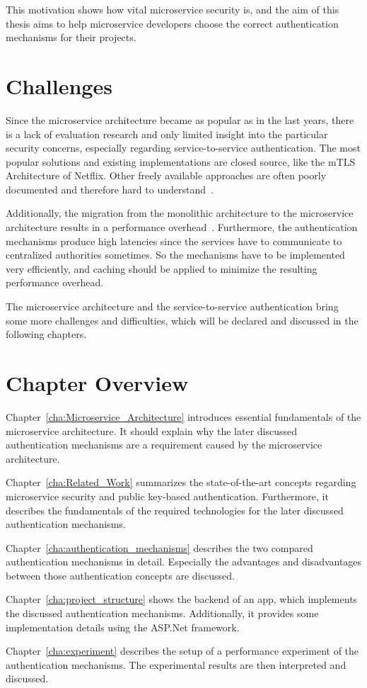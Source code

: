 This motivation shows how vital microservice security is, and the aim of this thesis aims to help microservice developers choose the correct authentication mechanisms for their projects.

\section{Challenges}
Since the microservice architecture became as popular as in the last years, there is a lack of evaluation research and only limited insight into the particular security concerns, especially regarding service-to-service authentication. 
The most popular solutions and existing implementations are closed source, like the mTLS Architecture of Netflix.
Other freely available approaches are often poorly documented and therefore hard to understand~\cite{yarygina2018overcoming}.

Additionally, the migration from the monolithic architecture to the microservice architecture results in a performance overhead~\cite{ueda2016workload}.
Furthermore, the authentication mechanisms produce high latencies since the services have to communicate to centralized authorities sometimes.
So the mechanisms have to be implemented very efficiently, and caching should be applied to minimize the resulting performance overhead.

The microservice architecture and the service-to-service authentication bring some more challenges and difficulties, which will be declared and discussed in the following chapters.

\section{Chapter Overview}
Chapter~\ref{cha:Microservice_Architecture} introduces essential fundamentals of the microservice architecture. 
It should explain why the later discussed authentication mechanisms are a requirement caused by the microservice architecture.

Chapter~\ref{cha:Related_Work} summarizes the state-of-the-art concepts regarding microservice security and public key-based authentication.
Furthermore, it describes the fundamentals of the required technologies for the later discussed authentication mechanisms.

Chapter~\ref{cha:authentication_mechanisms} describes the two compared authentication mechanisms in detail.
Especially the advantages and disadvantages between those authentication concepts are discussed.

Chapter~\ref{cha:project_structure} shows the backend of an app, which implements the discussed authentication mechanisms.
Additionally, it provides some implementation details using the ASP.Net framework.

Chapter~\ref{cha:experiment} describes the setup of a performance experiment of the authentication mechanisms.
The experimental results are then interpreted and discussed.
